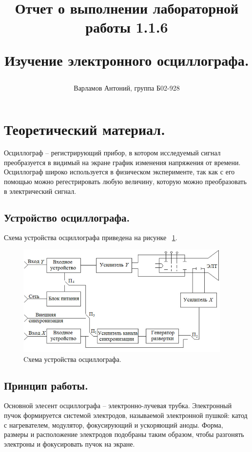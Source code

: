 \documentclass[12pt,a4paper]{article}
\begin{document}
\title{
Отчет о выполнении лабораторной работы 1.1.6

Изучение электронного осциллографа.
\author{Варламов Антоний, группа Б02-928}
}

\maketitle

\newpage

\section{Теоретический материал.}

	Осциллограф -- регистрирующий прибор, в котором исследуемый сигнал преобразуется в видимый на экране график изменения напряжения от времени. Осциллограф широко используется в физическом эксперименте, так как с его помощью можно регестрировать любую величину, которую можно преобразовать в электрический сигнал.
	\subsection{Устройство осциллографа.}
	Схема устройства осциллографа приведена на рисунке ~\ref{fig:schem}.
	
	\begin{figure}[h]
		\begin{center}
			\includegraphics[width = 0.95\textwidth]{Schem_oscillograph}
			\caption{Cхема устройства осциллографа.}
			\label{fig:schem}
		\end{center}
	\end{figure}		
		
	
	
	\subsection{Принцип работы.}
	Основной элесент осциллографа -- электронно-лучевая трубка. Электронный пучок формируется системой электродов, называемой электронной пушкой: катод с нагревателем, модулятор, фокусирующий и ускоряющий аноды. Форма, размеры и расположение электродов подобраны таким образом, чтобы разгонять электроны и фокусировать пучок на экране. 
	
\end{document}
